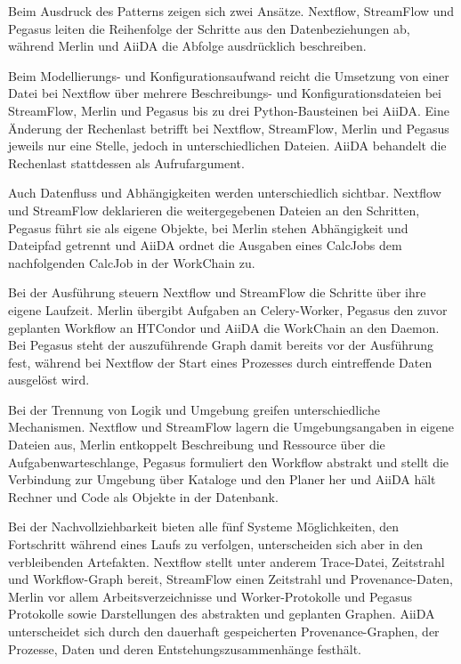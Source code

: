 Beim Ausdruck des Patterns zeigen sich zwei Ansätze. Nextflow,
StreamFlow und Pegasus leiten die Reihenfolge der Schritte aus den
Datenbeziehungen ab, während Merlin und AiiDA die Abfolge
ausdrücklich beschreiben.

Beim Modellierungs- und Konfigurationsaufwand reicht die Umsetzung
von einer Datei bei Nextflow über mehrere Beschreibungs- und
Konfigurationsdateien bei StreamFlow, Merlin und Pegasus bis zu drei
Python-Bausteinen bei AiiDA. Eine Änderung der Rechenlast betrifft
bei Nextflow, StreamFlow, Merlin und Pegasus jeweils nur eine Stelle,
jedoch in unterschiedlichen Dateien. AiiDA behandelt die Rechenlast
stattdessen als Aufrufargument.

Auch Datenfluss und Abhängigkeiten werden unterschiedlich sichtbar.
Nextflow und StreamFlow deklarieren die weitergegebenen Dateien an
den Schritten, Pegasus führt sie als eigene Objekte, bei Merlin
stehen Abhängigkeit und Dateipfad getrennt und AiiDA ordnet die
Ausgaben eines CalcJobs dem nachfolgenden CalcJob in der WorkChain
zu.

Bei der Ausführung steuern Nextflow und StreamFlow die Schritte über
ihre eigene Laufzeit. Merlin übergibt Aufgaben an Celery-Worker,
Pegasus den zuvor geplanten Workflow an HTCondor und AiiDA die
WorkChain an den Daemon. Bei Pegasus steht der auszuführende Graph
damit bereits vor der Ausführung fest, während bei Nextflow der Start
eines Prozesses durch eintreffende Daten ausgelöst wird.

Bei der Trennung von Logik und Umgebung greifen unterschiedliche
Mechanismen. Nextflow und StreamFlow lagern die Umgebungsangaben in
eigene Dateien aus, Merlin entkoppelt Beschreibung und Ressource über
die Aufgabenwarteschlange, Pegasus formuliert den Workflow abstrakt
und stellt die Verbindung zur Umgebung über Kataloge und den Planer
her und AiiDA hält Rechner und Code als Objekte in der Datenbank.

Bei der Nachvollziehbarkeit bieten alle fünf Systeme Möglichkeiten,
den Fortschritt während eines Laufs zu verfolgen, unterscheiden sich
aber in den verbleibenden Artefakten. Nextflow stellt unter anderem
Trace-Datei, Zeitstrahl und Workflow-Graph bereit, StreamFlow einen
Zeitstrahl und Provenance-Daten, Merlin vor allem Arbeitsverzeichnisse
und Worker-Protokolle und Pegasus Protokolle sowie Darstellungen des
abstrakten und geplanten Graphen. AiiDA unterscheidet sich durch den
dauerhaft gespeicherten Provenance-Graphen, der Prozesse, Daten und
deren Entstehungszusammenhänge festhält.

